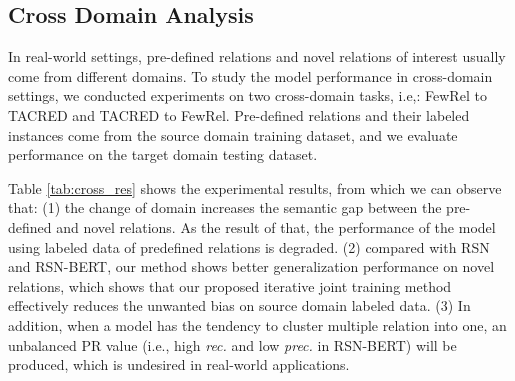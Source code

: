 \documentclass[11pt]{article}
\begin{document}
    \subsection{Cross Domain Analysis}
        \begin{table}
            \centering
            \caption{\label{tab:cross_res}
            Results on two constructed cross-domain tasks. F means FewRel, which is from encyclopedia domain. T means TACRED, which is from news and web domain. This table only lists the results of metric $B^3$. For results of other metrics, please refer to the Table \ref{tab:det_cro} in Appendix \ref{app:other}.}
        \end{table}   
        
        In real-world settings, pre-defined relations and novel relations of interest usually come from different domains. To study the model performance in cross-domain settings, we conducted experiments on two cross-domain tasks, i.e,: FewRel to TACRED and TACRED to FewRel. Pre-defined relations and their labeled instances come from the source domain training dataset, and we evaluate performance on the target domain testing dataset. 
        
        Table \ref{tab:cross_res} shows the experimental results, from which we can observe that: (1) the change of domain increases the semantic gap between the pre-defined and novel relations. As the result of that, the performance of the model using labeled data of predefined relations is degraded. (2) compared with RSN and RSN-BERT, our method shows better generalization performance on novel relations, which shows that our proposed iterative joint training method effectively reduces the unwanted bias on source domain labeled data. (3) In addition, when a model has the tendency to cluster multiple relation into one, an unbalanced PR value (i.e., high \textit{rec.} and low \textit{prec.} in RSN-BERT) will be produced, which is undesired in real-world applications.
     
\end{document}
